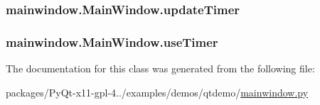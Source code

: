 \subsubsection[{update\+Timer}]{\setlength{\rightskip}{0pt plus 5cm}mainwindow.\+Main\+Window.\+update\+Timer}\label{classmainwindow_1_1MainWindow_af36f7ce50ea8e1aed9e505396d55b6e9}
\hypertarget{classmainwindow_1_1MainWindow_afda2a20b50793e3586b0dfe6a27c702e}{}
\subsubsection[{use\+Timer}]{\setlength{\rightskip}{0pt plus 5cm}mainwindow.\+Main\+Window.\+use\+Timer}\label{classmainwindow_1_1MainWindow_afda2a20b50793e3586b0dfe6a27c702e}


The documentation for this class was generated from the following file\+:\begin{DoxyCompactItemize}
\item 
packages/\+Py\+Qt-\/x11-\/gpl-\/4../examples/demos/qtdemo/\hyperlink{mainwindow_8py}{mainwindow.\+py}\end{DoxyCompactItemize}
